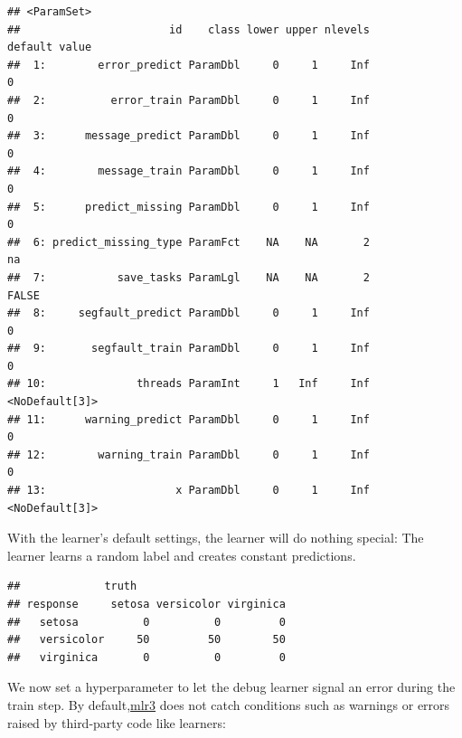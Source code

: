 \documentclass[
]{scrbook}
\newenvironment{Shaded}{\begin{snugshade}}{\end{snugshade}}
\newcommand{\FunctionTok}[1]{\textcolor[rgb]{0.00,0.00,0.00}{#1}}
\newcommand{\NormalTok}[1]{#1}
\newcommand{\OtherTok}[1]{\textcolor[rgb]{0.56,0.35,0.01}{#1}}
\newcommand{\SpecialCharTok}[1]{\textcolor[rgb]{0.00,0.00,0.00}{#1}}
\newcommand{\StringTok}[1]{\textcolor[rgb]{0.31,0.60,0.02}{#1}}
\renewenvironment{Shaded} {\begin{snugshade}\small} {\end{snugshade}}
\begin{document}
\begin{verbatim}
## <ParamSet>
##                       id    class lower upper nlevels        default value
##  1:        error_predict ParamDbl     0     1     Inf              0      
##  2:          error_train ParamDbl     0     1     Inf              0      
##  3:      message_predict ParamDbl     0     1     Inf              0      
##  4:        message_train ParamDbl     0     1     Inf              0      
##  5:      predict_missing ParamDbl     0     1     Inf              0      
##  6: predict_missing_type ParamFct    NA    NA       2             na      
##  7:           save_tasks ParamLgl    NA    NA       2          FALSE      
##  8:     segfault_predict ParamDbl     0     1     Inf              0      
##  9:       segfault_train ParamDbl     0     1     Inf              0      
## 10:              threads ParamInt     1   Inf     Inf <NoDefault[3]>      
## 11:      warning_predict ParamDbl     0     1     Inf              0      
## 12:        warning_train ParamDbl     0     1     Inf              0      
## 13:                    x ParamDbl     0     1     Inf <NoDefault[3]>
\end{verbatim}

With the learner's default settings, the learner will do nothing special: The learner learns a random label and creates constant predictions.

\begin{Shaded}
\end{Shaded}

\begin{verbatim}
##             truth
## response     setosa versicolor virginica
##   setosa          0          0         0
##   versicolor     50         50        50
##   virginica       0          0         0
\end{verbatim}

We now set a hyperparameter to let the debug learner signal an error during the train step.
By default,\href{https://github.com/mlr-org/mlr3}{mlr3} does not catch conditions such as warnings or errors raised by third-party code like learners:
\end{document}
